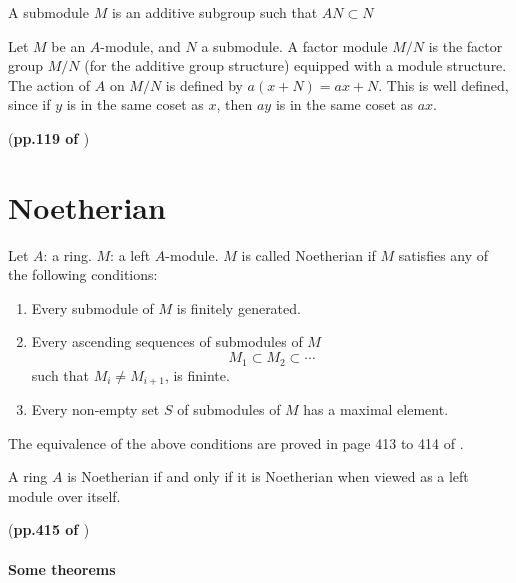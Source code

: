 \documentclass{article}
\begin{document}
\begin{defi}[Submodule]
    A submodule $M$ is an additive subgroup such that 
    $AN\subset N$
\end{defi}

\begin{defi}
    Let $M$ be an $A$-module, and $N$ a submodule. 
    A factor module $M/N$ is the factor group $M/N$ (for the
    additive group structure) equipped with a module structure.
    The action of $A$ on $M/N$ is defined by $a(x+N) = ax+N$.
    This is well defined, since if $y$ is in the same coset as
    $x$, then $ay$ is in the same coset as $ax$.
\end{defi}
(\textbf{pp.119 of \cite{lang}})

\section{Noetherian}
\label{sec:Noetherian}
\begin{defi}
    Let $A$: a ring. $M$: a left $A$-module. $M$ is called Noetherian
    if $M$ satisfies any of the following conditions:
    \begin{enumerate}
        \item Every submodule of $M$ is finitely generated.
        \item Every ascending sequences of submodules of $M$
            \[ M_1 \subset M_2 \subset \cdots \]
            such that $M_i \neq M_{i+1}$, is fininte.
        \item Every non-empty set $S$ of submodules of $M$ has a maximal
            element.
    \end{enumerate}
\end{defi}

The equivalence of the above conditions are proved in page 413 to 414 of 
\cite{lang}.

\begin{defi}
    A ring $A$ is Noetherian if and only if it is Noetherian when
    viewed as a left module over itself.
\end{defi}
(\textbf{pp.415 of \cite{lang}})

\paragraph{Some theorems} 
\end{document}
